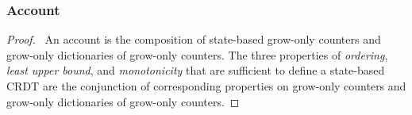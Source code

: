 \documentclass[9pt, oneside]{article}   	%
\begin{document}
\subsubsection{Account}
\label{sec:proof:account}



\begin{proof}
	\pfsketch ~An account is the composition of state-based grow-only counters and grow-only dictionaries of grow-only counters. The three properties of \textit{ordering}, \textit{least upper bound}, and \textit{monotonicity} that are sufficient to define a state-based CRDT are the conjunction of corresponding properties on grow-only counters and grow-only dictionaries of grow-only counters.
\end{proof}
\end{document}
